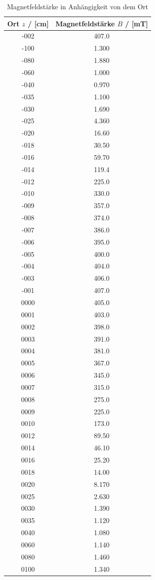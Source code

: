 \begin{table}[H]
  \centering
  \begin{tabular}{cc}
    \toprule
    Ort $z$ / [cm] & Magnetfeldstärke $B$ / [mT] \\
    \midrule
    -002 & 407.0 \\
    -100 & 1.300 \\
    -080 & 1.880 \\
    -060 & 1.000 \\
    -040 & 0.970 \\
    -035 & 1.100 \\
    -030 & 1.690 \\
    -025 & 4.360 \\
    -020 & 16.60 \\
    -018 & 30.50 \\
    -016 & 59.70 \\
    -014 & 119.4 \\
    -012 & 225.0 \\
    -010 & 330.0 \\
    -009 & 357.0 \\
    -008 & 374.0 \\
    -007 & 386.0 \\
    -006 & 395.0 \\
    -005 & 400.0 \\
    -004 & 404.0 \\
    -003 & 406.0 \\
    -001 & 407.0 \\
    0000 & 405.0 \\
    0001 & 403.0 \\
    0002 & 398.0 \\
    0003 & 391.0 \\
    0004 & 381.0 \\
    0005 & 367.0 \\
    0006 & 345.0 \\
    0007 & 315.0 \\
    0008 & 275.0 \\
    0009 & 225.0 \\
    0010 & 173.0 \\
    0012 & 89.50 \\
    0014 & 46.10 \\
    0016 & 25.20 \\
    0018 & 14.00 \\
    0020 & 8.170 \\
    0025 & 2.630 \\
    0030 & 1.390 \\
    0035 & 1.120 \\
    0040 & 1.080 \\
    0060 & 1.140 \\
    0080 & 1.460 \\
    0100 & 1.340 \\
    \bottomrule
  \end{tabular}
  \caption{Magnetfeldstärke in Anhängigkeit von dem Ort}
  \label{tab:B(z)}
\end{table}

